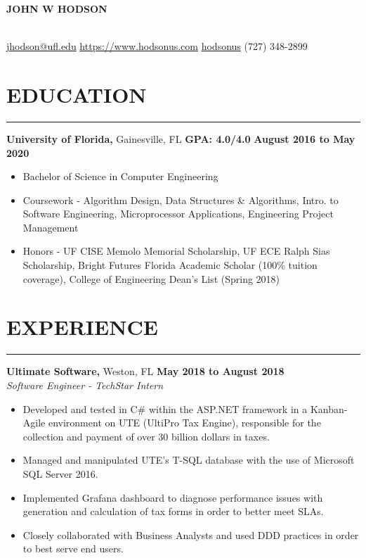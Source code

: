 \documentclass[11pt]{article} %
\begin{document}
	
	\noindent\centerline{ \huge\textbf{JOHN W HODSON}}\\
	
	\noindent\Email\space\href{mailto:jhodson@ufl.edu}{jhodson@ufl.edu} \hspace*{\fill} \ComputerMouse \space \href{https://www.hodsonus.com}{https://www.hodsonus.com} \hspace*{\fill} \faGithub \space \href{https://github.com/hodsonus}{hodsonus} \hspace*{\fill} \Mobilefone \space (727) 348-2899\\
	
	\section*{EDUCATION}
		\hrule \relax
		\vspace{.4cm}
		
		\noindent \textbf{University of Florida,} Gainesville, FL
		\hfill\textbf{GPA: 4.0/4.0}
		\hfill\textbf{August 2016 to May 2020}
		
		\begin{itemize}[noitemsep,nolistsep, label = {-}]
			\item Bachelor of Science in Computer Engineering
			\item Coursework - Algorithm Design, Data Structures \& Algorithms, Intro. to Software Engineering, Microprocessor Applications, Engineering Project Management
			\item Honors - UF CISE Memolo Memorial Scholarship, UF ECE Ralph Sias Scholarship, Bright Futures Florida Academic Scholar (100\% tuition coverage), College of Engineering Dean\rq s List (Spring 2018)
		\end{itemize}
		
		\vspace{.1cm}
	
	\section*{EXPERIENCE}
		\hrule \relax
		\vspace{.4cm}
		
		\noindent \textbf{Ultimate Software,} Weston, FL \hfill\textbf{May 2018 to August 2018}\\
		\textit{Software Engineer - TechStar Intern}
		\begin{itemize}[noitemsep,nolistsep, label = {-}]
			\item Developed and tested in C\# within the ASP.NET framework in a Kanban-Agile environment on UTE (UltiPro Tax Engine), responsible for the collection and payment of over 30 billion dollars in taxes.
			\item Managed and manipulated UTE's T-SQL database with the use of Microsoft SQL Server 2016.
			\item Implemented Grafana dashboard to diagnose performance issues with generation and calculation of tax forms in order to better meet SLAs.
			\item Closely collaborated with Business Analysts and used DDD practices in order to best serve end users.
		\end{itemize}
	
\end{document}
